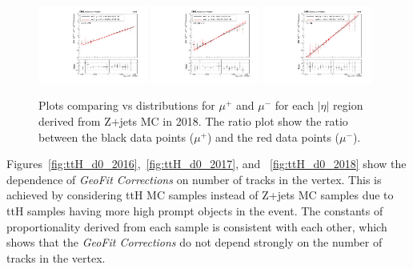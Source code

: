 \begin{figure}[h!]
    \centering
    \includegraphics[width=0.32\textwidth]{images_geofit/muCharge_eta_0_0p9_2018.pdf}
    \includegraphics[width=0.32\textwidth]{images_geofit/muCharge_eta_0p9_1p7_2018.pdf}
    \includegraphics[width=0.32\textwidth]{images_geofit/muCharge_eta_1p7_inf_2018.pdf}
    \caption{Plots comparing \dptoverptsquare vs \dzeroBS distributions for $\mu^+$ and $\mu^-$ for each $|\eta|$ region derived from Z+jets MC in 2018. The ratio plot show the ratio between the black data points ($\mu^+$) and the red data points ($\mu^-$).}
    \label{fig:muCharge_d0_2018}
\end{figure}

Figures~\ref{fig:ttH_d0_2016},~\ref{fig:ttH_d0_2017}, and ~\ref{fig:ttH_d0_2018} show the dependence of \textit{GeoFit Corrections} on number of tracks in the vertex. This is achieved by considering ttH MC samples instead of Z+jets MC samples due to ttH samples having more high \pt prompt objects in the event. The constants of proportionality derived from each sample is consistent with each other, which shows that the \textit{GeoFit Corrections} do not depend strongly on the number of tracks in the vertex.

